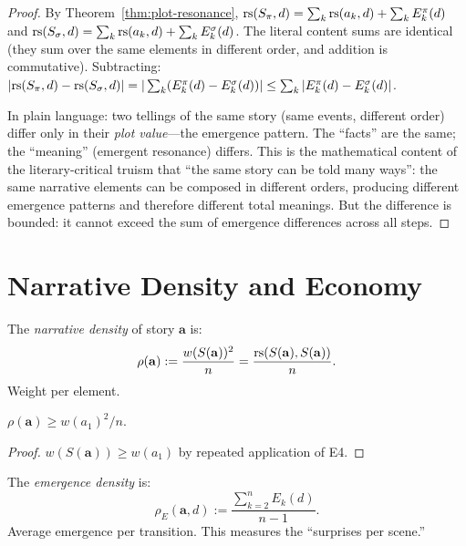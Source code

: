 \begin{proof}
By Theorem~\ref{thm:plot-resonance}, $\mathrm{rs}(S_\pi, d) = \sum_k \mathrm{rs}(a_k, d)
+ \sum_k E_k^\pi(d)$ and $\mathrm{rs}(S_\sigma, d) = \sum_k \mathrm{rs}(a_k, d) +
\sum_k E_k^\sigma(d)$.  The literal content sums are identical (they sum
over the same elements in different order, and addition is commutative).
Subtracting: $|\mathrm{rs}(S_\pi, d) - \mathrm{rs}(S_\sigma, d)| = |\sum_k (E_k^\pi(d) -
E_k^\sigma(d))| \leq \sum_k |E_k^\pi(d) - E_k^\sigma(d)|$.

In plain language: two tellings of the same story (same events, different
order) differ only in their \emph{plot value}---the emergence pattern.
The ``facts'' are the same; the ``meaning'' (emergent resonance) differs.
This is the mathematical content of the literary-critical truism that
``the same story can be told many ways'': the same narrative elements can
be composed in different orders, producing different emergence patterns
and therefore different total meanings.  But the difference is bounded: it
cannot exceed the sum of emergence differences across all steps.
\end{proof}


\section{Narrative Density and Economy}

\begin{definition}
\label{def:narrative-density}
The \emph{narrative density} of story $\mathbf{a}$ is:
\[
  \rho(\mathbf{a}) := \frac{w(S(\mathbf{a}))^2}{n} =
  \frac{\mathrm{rs}(S(\mathbf{a}), S(\mathbf{a}))}{n}.
\]
Weight per element.
\end{definition}

\begin{theorem}
\label{thm:density-lower-bound}
$\rho(\mathbf{a}) \geq w(a_1)^2 / n$.
\end{theorem}

\begin{proof}
$w(S(\mathbf{a})) \geq w(a_1)$ by repeated application of E4.
\end{proof}

\begin{definition}
\label{def:emergence-density}
The \emph{emergence density} is:
\[
  \rho_E(\mathbf{a}, d) := \frac{\sum_{k=2}^n E_k(d)}{n - 1}.
\]
Average emergence per transition.  This measures the ``surprises per scene.''
\end{definition}

